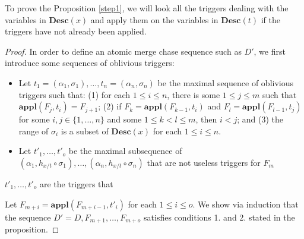 \documentclass{article}
\theoremstyle{definition}
\theoremstyle{remark}
\newcommand{\Appl}{\textbf{appl}}
\newcommand{\des}{\textbf{Desc}}
\begin{document}
To prove the Proposition \ref{step1}, we will look all the triggers dealing with the variables in $\des(x)$ and apply them on the variables in $\des(t)$ if the triggers have not already been applied.

\begin{proof}
In order to define an atomic merge chase sequence such as $D'$, we first introduce some sequences of oblivious triggers:
\begin{itemize}
\item Let $t_1 = (\alpha_1,\sigma_1),\ldots, t_n =(\alpha_n,\sigma_n)$ be the maximal sequence of oblivious triggers such that:
(1) for each $1 \leq i \leq n$, there is some $1 \leq j \leq m$ such that $\Appl(F_j, t_i) = F_{j+1}$;
(2) if $F_k = \Appl(F_{k-1}, t_i)$ and $F_l = \Appl(F_{l-1},t_j)$ for some $i, j \in \{1, \ldots, n\}$ and  some $1 \leq k < l \leq m$, then $i<j$; and (3) the range of $\sigma_i$ is a subset of $\des(x)$ for each $1 \leq i \leq n$.
\item Let $t'_1, \ldots, t'_o$ be the maximal subsequence of $(\alpha_1, h_{x/t} \circ \sigma_1), \ldots, (\alpha_n, h_{x/t} \circ \sigma_n)$ that are not useless triggers for $F_m$
\end{itemize}

$t'_1, \ldots, t'_o$ are the triggers that \todo{}

Let $F_{m+i} = \Appl(F_{m+i-1}, t'_i)$ for each $1 \leq i \leq o$.
We show via induction that the sequence $D' = D, F_{m+1}, \ldots, F_{m+o}$ satisfies conditions 1. and 2. stated in the proposition. 


\end{proof}
\end{document}
